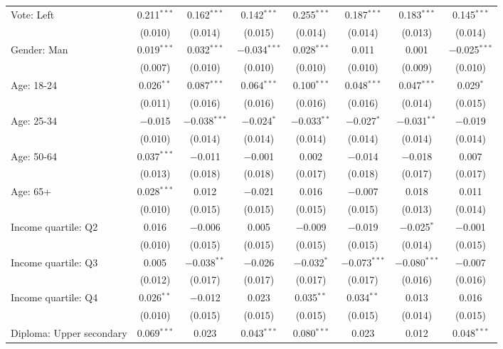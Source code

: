 \begin{tabular}{@{\extracolsep{5pt}}lccccccc}
  Vote: Left & 0.211$^{***}$ & 0.162$^{***}$ & 0.142$^{***}$ & 0.255$^{***}$ & 0.187$^{***}$ & 0.183$^{***}$ & 0.145$^{***}$ \\ 
  & (0.010) & (0.014) & (0.015) & (0.014) & (0.014) & (0.013) & (0.014) \\ 
  Gender: Man & 0.019$^{***}$ & 0.032$^{***}$ & $-$0.034$^{***}$ & 0.028$^{***}$ & 0.011 & 0.001 & $-$0.025$^{***}$ \\ 
  & (0.007) & (0.010) & (0.010) & (0.010) & (0.010) & (0.009) & (0.010) \\ 
  Age: 18\mbox{-}24 & 0.026$^{**}$ & 0.087$^{***}$ & 0.064$^{***}$ & 0.100$^{***}$ & 0.048$^{***}$ & 0.047$^{***}$ & 0.029$^{*}$ \\ 
  & (0.011) & (0.016) & (0.016) & (0.016) & (0.016) & (0.014) & (0.015) \\ 
  Age: 25\mbox{-}34 & $-$0.015 & $-$0.038$^{***}$ & $-$0.024$^{*}$ & $-$0.033$^{**}$ & $-$0.027$^{*}$ & $-$0.031$^{**}$ & $-$0.019 \\ 
  & (0.010) & (0.014) & (0.014) & (0.014) & (0.014) & (0.014) & (0.014) \\ 
  Age: 50\mbox{-}64 & 0.037$^{***}$ & $-$0.011 & $-$0.001 & 0.002 & $-$0.014 & $-$0.018 & 0.007 \\ 
  & (0.013) & (0.018) & (0.018) & (0.017) & (0.018) & (0.017) & (0.017) \\ 
  Age: 65+ & 0.028$^{***}$ & 0.012 & $-$0.021 & 0.016 & $-$0.007 & 0.018 & 0.011 \\ 
  & (0.010) & (0.015) & (0.015) & (0.015) & (0.015) & (0.013) & (0.014) \\ 
  Income quartile: Q2 & 0.016 & $-$0.006 & 0.005 & $-$0.009 & $-$0.019 & $-$0.025$^{*}$ & $-$0.001 \\ 
  & (0.010) & (0.015) & (0.015) & (0.015) & (0.015) & (0.014) & (0.015) \\ 
  Income quartile: Q3 & 0.005 & $-$0.038$^{**}$ & $-$0.026 & $-$0.032$^{*}$ & $-$0.073$^{***}$ & $-$0.080$^{***}$ & $-$0.007 \\ 
  & (0.012) & (0.017) & (0.017) & (0.017) & (0.017) & (0.016) & (0.016) \\ 
  Income quartile: Q4 & 0.026$^{**}$ & $-$0.012 & 0.023 & 0.035$^{**}$ & 0.034$^{**}$ & 0.013 & 0.016 \\ 
  & (0.010) & (0.015) & (0.015) & (0.015) & (0.015) & (0.014) & (0.015) \\ 
  Diploma: Upper secondary & 0.069$^{***}$ & 0.023 & 0.043$^{***}$ & 0.080$^{***}$ & 0.023 & 0.012 & 0.048$^{***}$ \\ 

\end{tabular}
